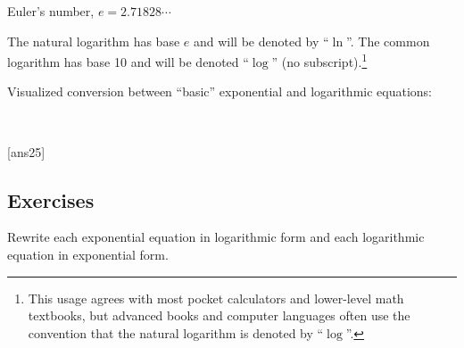 \documentclass{amsbook}
\numberwithin{section}{chapter}
\numberwithin{equation}{chapter}
\begin{document}
Euler's number, $e = 2.71828 \cdots$

The natural logarithm has base $e$ and will be denoted by ``$\ln$''. The common logarithm has base 10 and will be denoted ``$\log$'' (no subscript).\footnote{This usage agrees with most pocket calculators and lower-level math textbooks, but advanced books and computer languages often use the convention that the natural logarithm is denoted by ``$\log$''.}

Visualized conversion between ``basic'' exponential and logarithmic equations:
\begin{center}
\ \ \ \ \ \ \ \ \ \ \ \ \ 
\end{center}



[ans25]
\subsection*{Exercises \nopunct} \hfill

Rewrite each exponential equation in logarithmic form and each logarithmic equation in exponential form.
\end{document}
